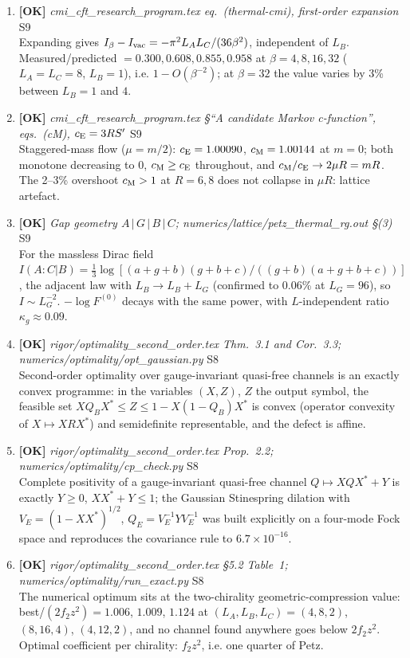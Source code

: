 \documentclass[11pt]{article}
\begin{document}
\begin{enumerate}[leftmargin=1.6em,itemsep=6pt]
\item \textbf{[OK]} \emph{cmi\_cft\_research\_program.tex eq.~(thermal-cmi), first-order expansion} \hfill\textsc{S9}\\ Expanding gives \(I_\beta-I_{\rm vac}=-\pi^2L_AL_C/(36\beta^2)\), independent of \(L_B\). Measured/predicted \(=0.300,0.608,0.855,0.958\) at \(\beta=4,8,16,32\) (\(L_A=L_C=8\), \(L_B=1\)), i.e. \(1-O(\beta^{-2})\); at \(\beta=32\) the value varies by 3\% between \(L_B=1\) and \(4\).
\item \textbf{[OK]} \emph{cmi\_cft\_research\_program.tex \S``A candidate Markov c-function'', eqs.~(cM), \(c_{\rm E}=3RS'\)} \hfill\textsc{S9}\\ Staggered-mass flow (\(\mu=m/2\)): \(c_{\rm E}=1.00090\), \(c_{\rm M}=1.00144\) at \(m=0\); both monotone decreasing to \(0\), \(c_{\rm M}\ge c_{\rm E}\) throughout, and \(c_{\rm M}/c_{\rm E}\to 2\mu R=mR\). The 2--3\% overshoot \(c_{\rm M}>1\) at \(R=6,8\) does not collapse in \(\mu R\): lattice artefact.
\item \textbf{[OK]} \emph{Gap geometry \(A\,|\,G\,|\,B\,|\,C\); numerics/lattice/petz\_thermal\_rg.out \S(3)} \hfill\textsc{S9}\\ For the massless Dirac field \(I(A{:}C|B)=\tfrac13\log[(a+g+b)(g+b+c)/((g+b)(a+g+b+c))]\), the adjacent law with \(L_B\to L_B+L_G\) (confirmed to 0.06\% at \(L_G=96\)), so \(I\sim L_G^{-2}\). \(-\log F^{(0)}\) decays with the same power, with \(L\)-independent ratio \(\kappa_g\approx0.09\).
\item \textbf{[OK]} \emph{rigor/optimality\_second\_order.tex Thm.~3.1 and Cor.~3.3; numerics/optimality/opt\_gaussian.py} \hfill\textsc{S8}\\ Second-order optimality over gauge-invariant quasi-free channels is an exactly convex programme: in the variables \((X,Z)\), \(Z\) the output symbol, the feasible set \(XQ_BX^*\le Z\le 1-X(1-Q_B)X^*\) is convex (operator convexity of \(X\mapsto XRX^*\)) and semidefinite representable, and the defect is affine.
\item \textbf{[OK]} \emph{rigor/optimality\_second\_order.tex Prop.~2.2; numerics/optimality/cp\_check.py} \hfill\textsc{S8}\\ Complete positivity of a gauge-invariant quasi-free channel \(Q\mapsto XQX^*+Y\) is exactly \(Y\ge0\), \(XX^*+Y\le1\); the Gaussian Stinespring dilation with \(V_E=(1-XX^*)^{1/2}\), \(Q_E=V_E^{-1}YV_E^{-1}\) was built explicitly on a four-mode Fock space and reproduces the covariance rule to \(6.7\times10^{-16}\).
\item \textbf{[OK]} \emph{rigor/optimality\_second\_order.tex \S5.2 Table~1; numerics/optimality/run\_exact.py} \hfill\textsc{S8}\\ The numerical optimum sits at the two-chirality geometric-compression value: best/\((2f_2z^2)=1.006\), \(1.009\), \(1.124\) at \((L_A,L_B,L_C)=(4,8,2)\), \((8,16,4)\), \((4,12,2)\), and no channel found anywhere goes below \(2f_2z^2\). Optimal coefficient per chirality: \(f_2z^2\), i.e. one quarter of Petz.

\end{enumerate}
\end{document}
